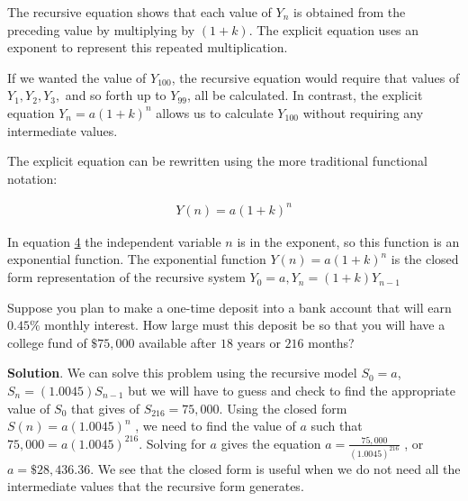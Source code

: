 \documentclass[10pt,]{book}
\theoremstyle{ptxdefinitionnotitle}
\theoremstyle{ptxdefinitiontitle}
\theoremstyle{ptxdefinitionnotitle}
\theoremstyle{ptxdefinitiontitle}
\theoremstyle{ptxdefinitionnotitle}
\theoremstyle{ptxdefinitiontitle}
\numberwithin{equation}{section}
\begin{document}
\hypertarget{p-90}{}%
The recursive equation shows that each value of \(Y_n\)  is obtained from the preceding value by multiplying by \((1+k)\). The explicit equation uses an exponent to represent this repeated multiplication.%
\par
\hypertarget{p-91}{}%
If we wanted the value of \(Y_{100}\), the recursive equation would require that values of \(Y_1, Y_2, Y_3,\) and so forth up to \(Y_{99}\),  all be calculated. In contrast, the explicit equation \(Y_n=a(1+k)^n\) allows us to calculate \(Y_{100}\) without requiring any intermediate values.%
\par
\hypertarget{p-92}{}%
The explicit equation can be rewritten using the more traditional functional notation:%
\begin{definition}\label{explicit-geometric-growth-equation}
%
\begin{gather*}
Y(n)=a(1+k)^n
\end{gather*}
\end{definition}
\hypertarget{p-93}{}%
In equation \hyperref[explicit-geometric-growth-equation]{4} the independent variable \(n\) is in the exponent, so this function is an exponential function. The exponential function \(Y(n)=a(1+k)^n\) is the closed form representation of the recursive system  \(Y_0=a,Y_n=(1+k)Y_{n-1}\)%
\begin{example}\label{example-one-time-bank-desposit}
\hypertarget{p-94}{}%
Suppose you plan to make a one-time deposit into a bank account that will earn \(0.45\%\) monthly interest.  How large must this deposit be so that you will have a college fund of \(\$75,000\) available after \(18\) years or \(216\) months?%
\par\smallskip%
\noindent\textbf{Solution}.\hypertarget{solution-7}{}\quad%
\hypertarget{p-95}{}%
We can solve this problem using the recursive model \(S_0 = a\), \(S_n = (1.0045) S_{n-1}\) but we will have to guess and check to find the appropriate value of \(S_0\) that gives of \(S_{216} = 75,000\).  Using the closed form \(S(n)=a(1.0045)^n\) , we need to find the value of \(a\) such that \(75,000 = a (1.0045)^{216}\).  Solving for \(a\) gives the equation \(a = \frac{75,000}{(1.0045)^{216}}\) , or \(a = \$28,436.36\).  We see that the closed form is useful when we do not need all the intermediate values that the recursive form generates.%
\end{example}
\end{document}
